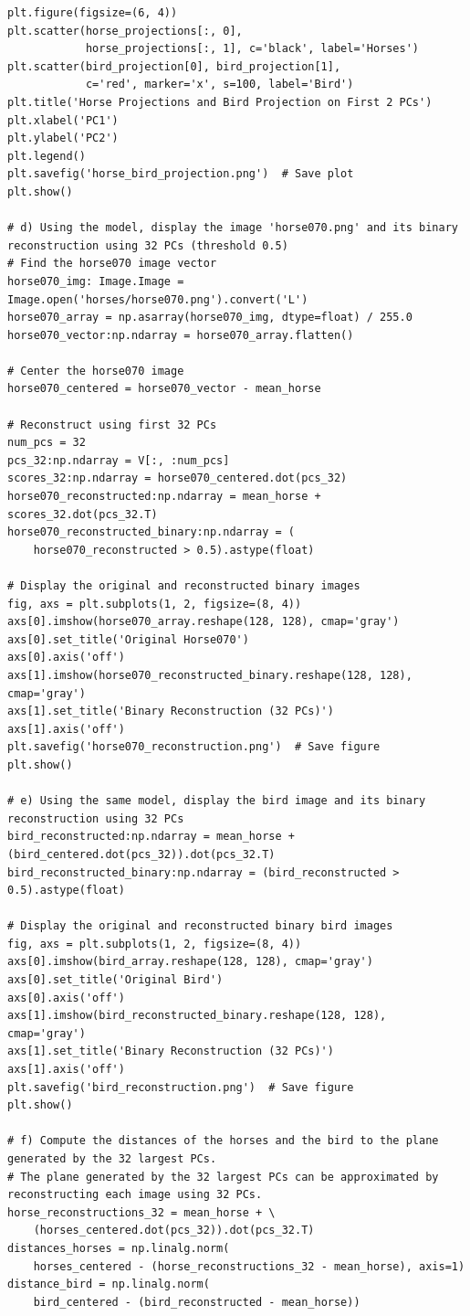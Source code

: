 \documentclass{article}
\begin{document}
\begin{verbatim}
plt.figure(figsize=(6, 4))
plt.scatter(horse_projections[:, 0],
            horse_projections[:, 1], c='black', label='Horses')
plt.scatter(bird_projection[0], bird_projection[1],
            c='red', marker='x', s=100, label='Bird')
plt.title('Horse Projections and Bird Projection on First 2 PCs')
plt.xlabel('PC1')
plt.ylabel('PC2')
plt.legend()
plt.savefig('horse_bird_projection.png')  # Save plot
plt.show()

# d) Using the model, display the image 'horse070.png' and its binary reconstruction using 32 PCs (threshold 0.5)
# Find the horse070 image vector
horse070_img: Image.Image = Image.open('horses/horse070.png').convert('L')
horse070_array = np.asarray(horse070_img, dtype=float) / 255.0
horse070_vector:np.ndarray = horse070_array.flatten()

# Center the horse070 image
horse070_centered = horse070_vector - mean_horse

# Reconstruct using first 32 PCs
num_pcs = 32
pcs_32:np.ndarray = V[:, :num_pcs]
scores_32:np.ndarray = horse070_centered.dot(pcs_32)
horse070_reconstructed:np.ndarray = mean_horse + scores_32.dot(pcs_32.T)
horse070_reconstructed_binary:np.ndarray = (
    horse070_reconstructed > 0.5).astype(float)

# Display the original and reconstructed binary images
fig, axs = plt.subplots(1, 2, figsize=(8, 4))
axs[0].imshow(horse070_array.reshape(128, 128), cmap='gray')
axs[0].set_title('Original Horse070')
axs[0].axis('off')
axs[1].imshow(horse070_reconstructed_binary.reshape(128, 128), cmap='gray')
axs[1].set_title('Binary Reconstruction (32 PCs)')
axs[1].axis('off')
plt.savefig('horse070_reconstruction.png')  # Save figure
plt.show()

# e) Using the same model, display the bird image and its binary reconstruction using 32 PCs
bird_reconstructed:np.ndarray = mean_horse + (bird_centered.dot(pcs_32)).dot(pcs_32.T)
bird_reconstructed_binary:np.ndarray = (bird_reconstructed > 0.5).astype(float)

# Display the original and reconstructed binary bird images
fig, axs = plt.subplots(1, 2, figsize=(8, 4))
axs[0].imshow(bird_array.reshape(128, 128), cmap='gray')
axs[0].set_title('Original Bird')
axs[0].axis('off')
axs[1].imshow(bird_reconstructed_binary.reshape(128, 128), cmap='gray')
axs[1].set_title('Binary Reconstruction (32 PCs)')
axs[1].axis('off')
plt.savefig('bird_reconstruction.png')  # Save figure
plt.show()

# f) Compute the distances of the horses and the bird to the plane generated by the 32 largest PCs.
# The plane generated by the 32 largest PCs can be approximated by reconstructing each image using 32 PCs.
horse_reconstructions_32 = mean_horse + \
    (horses_centered.dot(pcs_32)).dot(pcs_32.T)
distances_horses = np.linalg.norm(
    horses_centered - (horse_reconstructions_32 - mean_horse), axis=1)
distance_bird = np.linalg.norm(
    bird_centered - (bird_reconstructed - mean_horse))


\end{verbatim}
\end{document}
